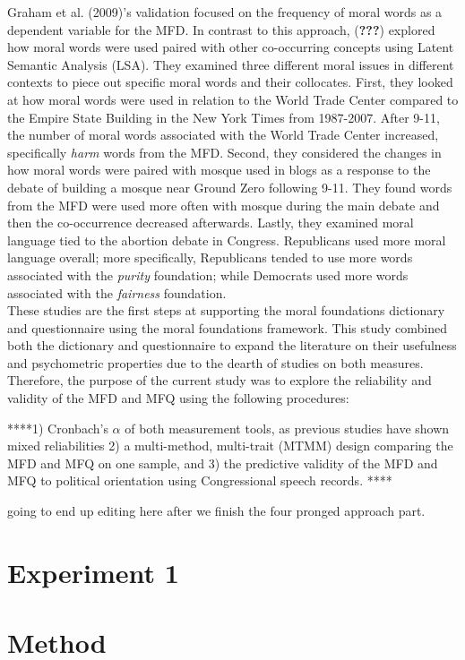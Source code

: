 \documentclass[english,man]{apa6}
\theoremstyle{definition}
\theoremstyle{definition}
\theoremstyle{definition}
\theoremstyle{remark}
\begin{document}
Graham et al. (2009)'s validation focused on the frequency of moral
words as a dependent variable for the MFD. In contrast to this approach,
({\textbf{???}}) explored how moral words were used paired with other
co-occurring concepts using Latent Semantic Analysis (LSA). They
examined three different moral issues in different contexts to piece out
specific moral words and their collocates. First, they looked at how
moral words were used in relation to the World Trade Center compared to
the Empire State Building in the New York Times from 1987-2007. After
9-11, the number of moral words associated with the World Trade Center
increased, specifically \emph{harm} words from the MFD. Second, they
considered the changes in how moral words were paired with mosque used
in blogs as a response to the debate of building a mosque near Ground
Zero following 9-11. They found words from the MFD were used more often
with mosque during the main debate and then the co-occurrence decreased
afterwards. Lastly, they examined moral language tied to the abortion
debate in Congress. Republicans used more moral language overall; more
specifically, Republicans tended to use more words associated with the
\emph{purity} foundation; while Democrats used more words associated
with the \emph{fairness} foundation.\\
These studies are the first steps at supporting the moral foundations
dictionary and questionnaire using the moral foundations framework. This
study combined both the dictionary and questionnaire to expand the
literature on their usefulness and psychometric properties due to the
dearth of studies on both measures. Therefore, the purpose of the
current study was to explore the reliability and validity of the MFD and
MFQ using the following procedures:

****1) Cronbach's \(\alpha\) of both measurement tools, as previous
studies have shown mixed reliabilities 2) a multi-method, multi-trait
(MTMM) design comparing the MFD and MFQ on one sample, and 3) the
predictive validity of the MFD and MFQ to political orientation using
Congressional speech records. ****

going to end up editing here after we finish the four pronged approach
part.

\section{Experiment 1}\label{experiment-1}

\section{Method}\label{method}
\end{document}

